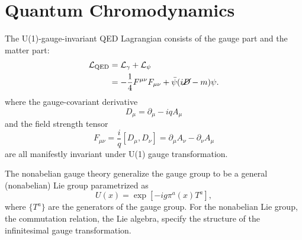 \chapter{Quantum Chromodynamics}


The U(1)-gauge-invariant QED Lagrangian consists of the gauge part and the matter part:
\begin{equation}
\begin{aligned}
	\mathcal L_{\mathrm{QED}} &= \mathcal L_\gamma + \mathcal L_\psi \\
	&= -\frac{1}{4} F^{\mu\nu} F_{\mu\nu} + \bar\psi(i\cancel D-m)\psi.
\end{aligned}
\end{equation}
where the gauge-covariant derivative 
\begin{equation}
	D_\mu = \partial_\mu - iq A_\mu
\end{equation}
and the field strength tensor
\begin{equation}
	F_{\mu\nu} = \frac{i}{q} [D_\mu, D_\nu] = \partial_\mu A_\nu -\partial_\nu A_\mu
\end{equation}
are all manifestly invariant under U(1) gauge transformation.

The nonabelian gauge theory generalize the gauge group to be a general (nonabelian) Lie group parametrized as
\begin{equation}
	U(x) = \exp\left[-i g \pi^a(x) T^a\right],
\end{equation}
where $\{T^a\}$ are the generators of the gauge group.
For the nonabelian Lie group, the commutation relation, the Lie algebra, specify the structure of the infinitesimal gauge transformation.

